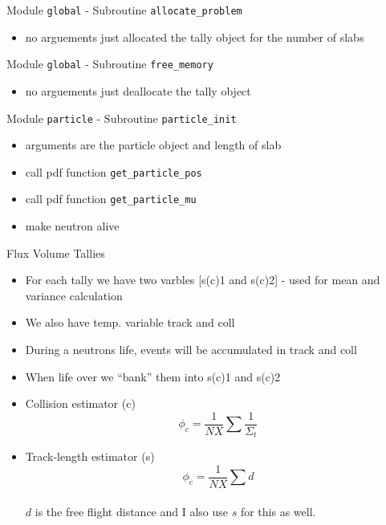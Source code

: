 \documentclass{beamer}
\begin{document}
\begin{frame}{Module \texttt{global} - Subroutine \texttt{allocate\_problem}}

  \begin{itemize}
    \item no arguements just allocated the tally object for the number of slabs
  \end{itemize}

\end{frame}
\begin{frame}{Module \texttt{global} - Subroutine \texttt{free\_memory}}

  \begin{itemize}
    \item no arguements just deallocate the tally object
  \end{itemize}

\end{frame}
\begin{frame}{Module \texttt{particle} - Subroutine \texttt{particle\_init}}

  \begin{itemize}
    \item arguments are the particle object and length of slab
    \vfill\item call pdf function \texttt{get\_particle\_pos}
    \vfill\item call pdf function \texttt{get\_particle\_mu}
    \vfill\item make neutron alive
  \end{itemize}

\end{frame}
\begin{frame}{Flux Volume Tallies}

  \begin{itemize}
    \item For each tally we have two varbles [s(c)1 and s(c)2] - used for mean and variance calculation
    \vfill\item We also have temp. variable track and coll
    \vfill\item During a neutrons life, events will be accumulated in track and coll
    \vfill\item When life over we ``bank'' them into s(c)1 and s(c)2
    \vfill\item Collision estimator (c)
\[
 \phi_{c} = \frac{1}{NX}\sum \frac{1}{\Sigma_{t}}
\]
    \item Track-length estimator (s)
\[
 \phi_{c} = \frac{1}{NX}\sum d
\] \\
\alert{$d$ is the free flight distance and I also use $s$ for this as well.}
  \end{itemize}

\end{frame}
\end{document}
